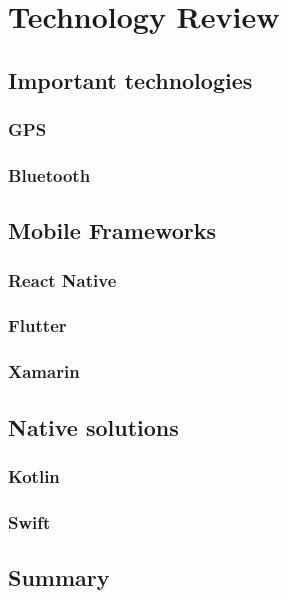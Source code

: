 \documentclass[../Main.tex]{subfiles}
\begin{document}
\section{Technology Review}
\label{chap:7}

\subsection{Important technologies}
\subsubsection{GPS}
\subsubsection{Bluetooth}

\subsection{Mobile Frameworks}
\subsubsection{React Native}
\subsubsection{Flutter}
\subsubsection{Xamarin}

\subsection{Native solutions}
\subsubsection{Kotlin}
\subsubsection{Swift}

\subsection{Summary}

\biblio %
\end{document}
